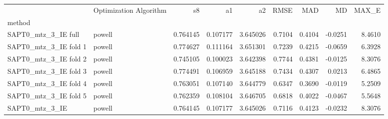 \begin{tabular}{llrrrrrrr}
 & Optimization Algorithm & s8 & a1 & a2 & RMSE & MAD & MD & MAX_E \\
method &  &  &  &  &  &  &  &  \\
SAPT0_mtz_3_IE full & powell & 0.764145 & 0.107177 & 3.645026 & 0.7104 & 0.4104 & -0.0251 & 8.4610 \\
SAPT0_mtz_3_IE fold 1 & powell & 0.774627 & 0.111164 & 3.651301 & 0.7239 & 0.4215 & -0.0659 & 6.3928 \\
SAPT0_mtz_3_IE fold 2 & powell & 0.745105 & 0.100023 & 3.642398 & 0.7744 & 0.4381 & -0.0125 & 8.3076 \\
SAPT0_mtz_3_IE fold 3 & powell & 0.774491 & 0.106959 & 3.645188 & 0.7434 & 0.4307 & 0.0213 & 6.4865 \\
SAPT0_mtz_3_IE fold 4 & powell & 0.763051 & 0.107140 & 3.644779 & 0.6347 & 0.3690 & -0.0119 & 5.2509 \\
SAPT0_mtz_3_IE fold 5 & powell & 0.762359 & 0.108104 & 3.646705 & 0.6818 & 0.4022 & -0.0467 & 5.5648 \\
SAPT0_mtz_3_IE & powell & 0.764145 & 0.107177 & 3.645026 & 0.7116 & 0.4123 & -0.0232 & 8.3076 \\
\end{tabular}

